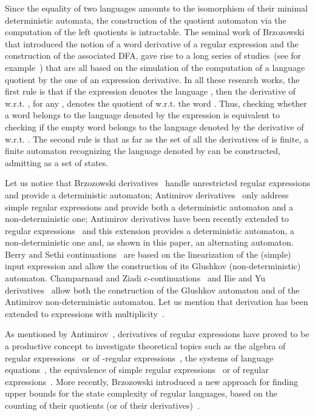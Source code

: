 \documentclass{article}
\begin{document}
Since the equality of two languages amounts to 
the isomorphism of their minimal deterministic automata, 
the construction of the quotient automaton via the computation of the left quotients is intractable.
The seminal work of Brzozowski~\cite{Brz64}
that introduced the notion of a word derivative of a regular expression
and the construction of the associated DFA,
gave rise to a long series of studies~(see for example~\cite{BS86,Ant96,CZ01c,IY03,CCM11b}) 
that are all based on 
the simulation of the computation of a language 
quotient
by the one of an expression derivative.
In all these research works, the first rule is that if the expression  denotes the language ,
then the derivative of  w.r.t. , for any , denotes the quotient of  w.r.t. the word .
Thus, checking whether a word  belongs to the language denoted by the expression   is equivalent to 
checking if the empty word belongs to the language denoted by the derivative of  w.r.t. .
The second rule is that as far as the set  of all the derivatives of  is finite,
a finite automaton recognizing the language denoted by  can be constructed,
admitting  as a set of states.

Let us notice 
that Brzozowski derivatives~\cite{Brz64} handle 
unrestricted regular expressions and provide a deterministic automaton;
Antimirov derivatives~\cite{Ant96} only address simple regular expressions 
and provide both a deterministic automaton and a non-deterministic one;
Antimirov derivatives have been recently extended to 
regular expressions~\cite{CCM11b} and this extension
provides a deterministic automaton, a non-deterministic one
and, as shown in this paper, an alternating automaton.
Berry and Sethi continuations~\cite{BS86} are based on the linearization of the (simple) input expression
and allow the construction of its Glushkov (non-deterministic) automaton.
Champarnaud and Ziadi c-continuations~\cite{CZ01c} and Ilie and Yu derivatives~\cite{IY03}
allow both the construction of the Glushkov automaton and of the Antimirov non-deterministic automaton.
Let us mention that derivation has been extended to expressions with multiplicity~\cite{LS01,COZ09}. 
 
As mentioned by Antimirov~\cite{Ant96},
derivatives of regular expressions have proved to be a productive concept to investigate theoretical topics such as
the algebra of regular expressions~\cite{Con71} or
of -regular expressions~\cite{Kro92},
the systems of language equations~\cite{BL80},
the equivalence of simple regular expressions~\cite{Gin67} or of regular expressions~\cite{AM95}.
More recently, Brzozowski introduced a new approach for finding upper bounds
for the state complexity of regular languages,
based on the counting of their quotients (or of their derivatives)~\cite{Brz10}.
\end{document}
